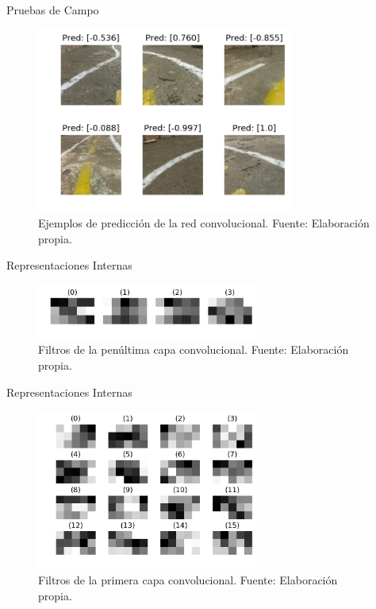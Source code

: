 \documentclass[10pt]{beamer}
\begin{document}
\begin{frame}{Pruebas de Campo}
    \begin{figure}[!h] 
        \centering
        \includegraphics[width=0.75\textwidth]{../img/testimg}
        \caption[Ejemplos de predicción de la red convolucional]{Ejemplos de predicción de la red convolucional. Fuente: Elaboración propia. }
        \label{fig:testimg}
    \end{figure}
\end{frame}

\begin{frame}{Representaciones Internas}
    \begin{figure}[!h] 
        \centering
        \includegraphics[width=0.65\textwidth]{../img/filtros7}
        \caption[Filtros de la penúltima capa convolucional]{Filtros de la penúltima capa convolucional. Fuente: Elaboración propia. }
        \label{fig:filtros7}
    \end{figure}
\end{frame}

\begin{frame}{Representaciones Internas}
    \begin{figure}[!h] 
        \centering
        \includegraphics[width=0.65\textwidth]{../img/filtros1}
        \caption[Filtros de la primera capa convolucional]{Filtros de la primera capa convolucional. Fuente: Elaboración propia. }
        \label{fig:filtros1}
    \end{figure}
\end{frame}
\end{document}
